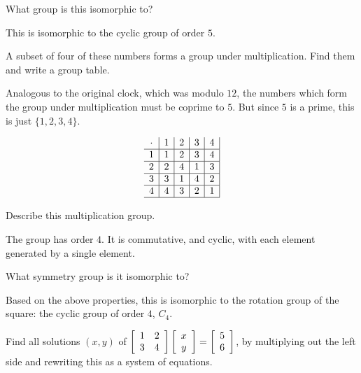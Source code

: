 \documentclass[../key.tex]{subfiles}
\begin{document}
\begin{inner_problem}
\item What group is this isomorphic to?
\end{inner_problem}

This is isomorphic to the cyclic group of order $5$.

\begin{inner_problem}
\item A subset of four of these numbers forms a group under multiplication. Find them and write a group table.
\end{inner_problem}

Analogous to the original clock, which was modulo $12$, the numbers which form the group under multiplication must be coprime to $5$. But since $5$ is a prime, this is just $\{1,2,3,4\}$.

$$\begin{array}{c|c|c|c|c|}
\cdot & 1 & 2 & 3 & 4 \\ \hline
1 & 1 & 2 & 3 & 4 \\ \hline
2 & 2 & 4 & 1 & 3 \\ \hline
3 & 3 & 1 & 4 & 2 \\ \hline
4 & 4 & 3 & 2 & 1 \\ \hline
\end{array}$$

\begin{inner_problem}
\item Describe this multiplication group.
\end{inner_problem}

The group has order $4$. It is commutative, and cyclic, with each element generated by a single element.

\begin{inner_problem}
\item What symmetry group is it isomorphic to?
\end{inner_problem}

Based on the above properties, this is isomorphic to the rotation group of the square: the cyclic group of order $4$, $C_4$.

\begin{outer_problem}
\item
\end{outer_problem}

\begin{inner_problem}[start=1]
\item \label{prob:needed_for_matrix_undo3}Find all solutions $(x,y)$ of $\left[\begin{array}{cc} 1 & 2 \\ 3 & 4 \end{array}\right]\left[\begin{array}{c} x \\ y \end{array}\right]=\left[\begin{array}{c} 5 \\ 6 \end{array}\right]$, by multiplying out the left side and rewriting this as a system of equations.
\end{inner_problem}
\end{document}
